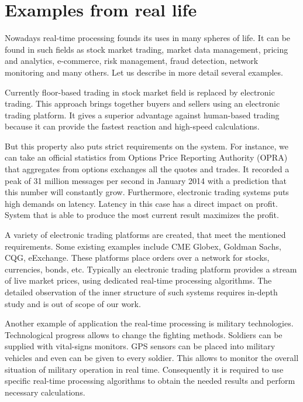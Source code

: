 \section{Examples from real life}

% 
% 

Nowadays real-time processing founds its uses in many spheres of life.
It can be found in such fields as stock market trading, market data management, pricing and analytics, e-commerce, risk management, fraud detection, network monitoring and many others. 
Let us describe in more detail several examples.

Currently floor-based trading in stock market field is replaced by electronic trading.
This approach brings together buyers and sellers using an electronic trading platform.
It gives a superior advantage against human-based trading because it can provide the fastest reaction and high-speed calculations.

But this property also puts strict requirements on the system.
For instance, we can take an official statistics from Options Price Reporting Authority (OPRA) that aggregates from options exchanges all the quotes and trades.   
It recorded a peak of 31 million messages per second in January 2014 with a prediction that this number will constantly grow.
Furthermore, electronic trading systems puts high demands on latency.
Latency in this case has a direct impact on profit.
System that is able to produce the most current result maximizes the profit. 

A variety of electronic trading platforms are created, that meet the mentioned requirements.
Some existing examples include CME Globex, Goldman Sachs, CQG, eExchange. 
These platforms place orders over a network for stocks, currencies, bonds, etc.
Typically an electronic trading platform provides a stream of live market prices, using dedicated real-time processing algorithms.
The detailed observation of the inner structure of such systems requires in-depth study and is out of scope of our work.

Another example of application the real-time processing is military technologies.
Technological progress allows to change the fighting methods.
Soldiers can be supplied with vital-signs monitors.
GPS sensors can be placed into military vehicles and even can be given to every soldier.
This allows to monitor the overall situation of military operation in real time.
Consequently it is required to use specific real-time processing algorithms to obtain the needed results and perform necessary calculations.

